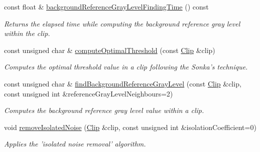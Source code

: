 \begin{CompactItemize}
const float \& \hyperlink{class_preprocessor_001ec84b94a5d92a2bce6b854b4d3e7d}{backgroundReferenceGrayLevelFindingTime} () const 
\begin{CompactList}\small\item\em Returns the elapsed time while computing the background reference gray level within the clip. \item\end{CompactList}\item 
const unsigned char \& \hyperlink{class_preprocessor_ac2f414d6f4f917419f33f6067eb8634}{computeOptimalThreshold} (const \hyperlink{class_clip}{Clip} \&clip)
\begin{CompactList}\small\item\em Computes the optimal threshold value in a clip following the Sonka's technique. \item\end{CompactList}\item 
const unsigned char \& \hyperlink{class_preprocessor_a941f81382bd8e235e4dd12481342be4}{findBackgroundReferenceGrayLevel} (const \hyperlink{class_clip}{Clip} \&clip, const unsigned int \&referenceGrayLevelNeighbours=2)
\begin{CompactList}\small\item\em Computes the background reference gray level value within a clip. \item\end{CompactList}\item 
void \hyperlink{class_preprocessor_a3e047486a0a80f2103f51d7141e41c5}{removeIsolatedNoise} (\hyperlink{class_clip}{Clip} \&clip, const unsigned int \&isolationCoefficient=0)
\begin{CompactList}\small\item\em Applies the 'isolated noise removal' algorithm. \item\end{CompactList}\end{CompactItemize}
